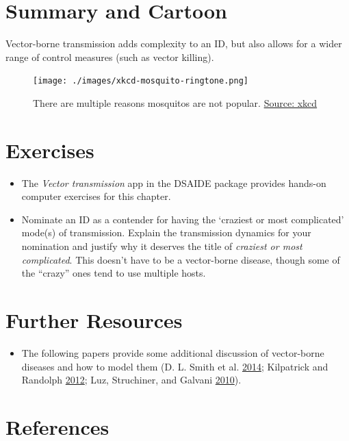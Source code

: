\documentclass[
]{book}
\providecommand{\tightlist}{%
  \setlength{\itemsep}{0pt}\setlength{\parskip}{0pt}}
\begin{document}
\hypertarget{summary-and-cartoon-7}{%
\section{Summary and Cartoon}\label{summary-and-cartoon-7}}

Vector-borne transmission adds complexity to an ID, but also allows for a wider range of control measures (such as vector killing).

\begin{figure}
\centering
\texttt{[image: ./images/xkcd-mosquito-ringtone.png]}
\caption{There are multiple reasons mosquitos are not popular. \href{https://xkcd.com/1241/}{Source: xkcd}}
\end{figure}

\hypertarget{exercises-7}{%
\section{Exercises}\label{exercises-7}}

\begin{itemize}
\tightlist
\item
  The \emph{Vector transmission} app in the DSAIDE package provides hands-on computer exercises for this chapter.
\item
  Nominate an ID as a contender for having the `craziest or most complicated' mode(s) of transmission. Explain the transmission dynamics for your nomination and justify why it deserves the title of \emph{craziest or most complicated}. This doesn't have to be a vector-borne disease, though some of the ``crazy'' ones tend to use multiple hosts.
\end{itemize}

\hypertarget{further-resources-7}{%
\section{Further Resources}\label{further-resources-7}}

\begin{itemize}
\tightlist
\item
  The following papers provide some additional discussion of vector-borne diseases and how to model them (D. L. Smith et al. \protect\hyperlink{ref-smith14}{2014}; Kilpatrick and Randolph \protect\hyperlink{ref-kilpatrick12}{2012}; Luz, Struchiner, and Galvani \protect\hyperlink{ref-luz10}{2010}).
\end{itemize}

\hypertarget{references-8}{%
\section{References}\label{references-8}}
\end{document}
